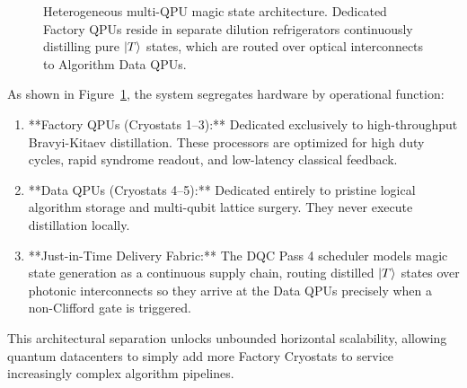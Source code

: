 \begin{figure}[htbp]
    \caption{Heterogeneous multi-QPU magic state architecture. Dedicated Factory QPUs reside in separate dilution refrigerators continuously distilling pure $\ket{T}$ states, which are routed over optical interconnects to Algorithm Data QPUs.}
    \label{fig:distributed_magic_state_fabric}
\end{figure}

As shown in Figure~\ref{fig:distributed_magic_state_fabric}, the system segregates hardware by operational function:
\begin{enumerate}
    \item **Factory QPUs (Cryostats 1--3):** Dedicated exclusively to high-throughput Bravyi-Kitaev distillation. These processors are optimized for high duty cycles, rapid syndrome readout, and low-latency classical feedback.
    \item **Data QPUs (Cryostats 4--5):** Dedicated entirely to pristine logical algorithm storage and multi-qubit lattice surgery. They never execute distillation locally.
    \item **Just-in-Time Delivery Fabric:** The DQC Pass 4 scheduler models magic state generation as a continuous supply chain, routing distilled $\ket{T}$ states over photonic interconnects so they arrive at the Data QPUs precisely when a non-Clifford gate is triggered.
\end{enumerate}

This architectural separation unlocks unbounded horizontal scalability, allowing quantum datacenters to simply add more Factory Cryostats to service increasingly complex algorithm pipelines.
